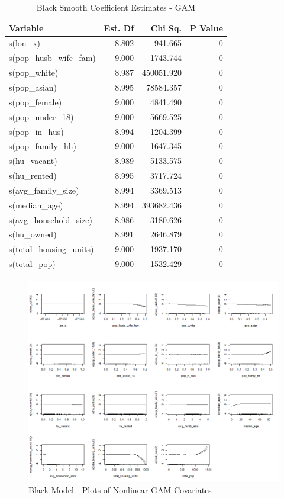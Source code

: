 \documentclass{ucetd}
\begin{document}
\begin{table}

\caption{\label{tab:black-gam}Black Smooth Coefficient Estimates - GAM}
\centering
\begin{tabular}[t]{l|r|r|r}
\hline
Variable & Est. Df & Chi Sq. & P Value\\
\hline
s(lon\_x) & 8.802 & 941.665 & 0\\
\hline
s(pop\_husb\_wife\_fam) & 9.000 & 1743.744 & 0\\
\hline
s(pop\_white) & 8.987 & 450051.920 & 0\\
\hline
s(pop\_asian) & 8.995 & 78584.357 & 0\\
\hline
s(pop\_female) & 9.000 & 4841.490 & 0\\
\hline
s(pop\_under\_18) & 9.000 & 5669.525 & 0\\
\hline
s(pop\_in\_hus) & 8.994 & 1204.399 & 0\\
\hline
s(pop\_family\_hh) & 9.000 & 1647.345 & 0\\
\hline
s(hu\_vacant) & 8.989 & 5133.575 & 0\\
\hline
s(hu\_rented) & 8.995 & 3717.724 & 0\\
\hline
s(avg\_family\_size) & 8.994 & 3369.513 & 0\\
\hline
s(median\_age) & 8.994 & 393682.436 & 0\\
\hline
s(avg\_household\_size) & 8.986 & 3180.626 & 0\\
\hline
s(hu\_owned) & 8.991 & 2646.879 & 0\\
\hline
s(total\_housing\_units) & 9.000 & 1937.170 & 0\\
\hline
s(total\_pop) & 9.000 & 1532.429 & 0\\
\hline
\end{tabular}
\end{table}

\begin{figure}
\centering
\includegraphics[width=1\textwidth,height=\textheight]{..//Modeling/modeling_files/figure-gfm/gam-black-1.png}
\caption{Black Model - Plots of Nonlinear GAM Covariates}
\end{figure}
\end{document}
